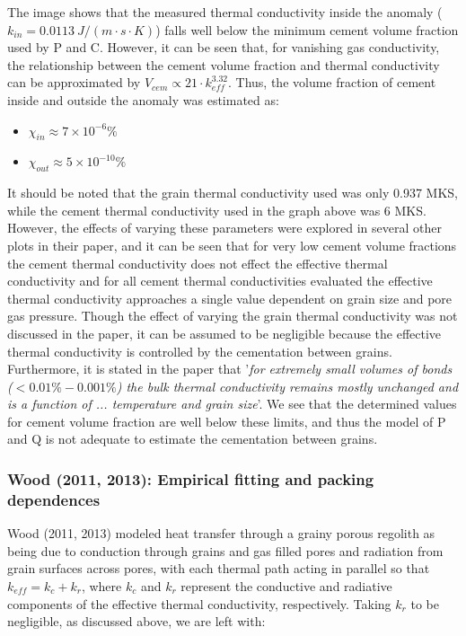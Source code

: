 \documentclass[11pt]{article} %
\begin{document}
	The image shows that the measured thermal conductivity inside the anomaly ($k_{in} = 0.0113 \: J/(m \cdot s \cdot K)$) falls well below the minimum cement volume fraction used by P and C. However, it can be seen that, for vanishing gas conductivity,  the relationship between the cement volume fraction and thermal conductivity can be approximated by $V_{cem} \varpropto 21\cdot k_{eff}^{3.32}$. Thus, the volume fraction of cement inside and outside the anomaly was estimated as:
	
	\begin{itemize}
	\item $\chi_{in} \approx 7\times10^{-6}\%$
	\item $\chi_{out} \approx 5\times10^{-10}\%$
	\end{itemize}
	
	It should be noted that the grain thermal conductivity used was only 0.937 MKS, while the cement thermal conductivity used in the graph above was 6 MKS. However, the effects of varying these parameters were explored in several other plots in their paper, and it can be seen that for very low cement volume fractions the cement thermal conductivity does not effect the effective thermal conductivity and for all cement thermal conductivities evaluated the effective thermal conductivity approaches a single value dependent on grain size and pore gas pressure. Though the effect of varying the grain thermal conductivity was not discussed in the paper, it can be assumed to be negligible because the effective thermal conductivity is controlled by the cementation between grains. Furthermore, it is stated in the paper that '\emph{for extremely small volumes of bonds ($< 0.01\%-0.001\%$) the bulk thermal conductivity remains mostly unchanged and is a function of ... temperature and grain size}'. We see that the determined values for cement volume fraction are well below these limits, and thus the model of P and Q is not adequate to estimate the cementation between grains. 

\subsubsection{Wood (2011, 2013): Empirical fitting and packing dependences}
	 Wood (2011, 2013) modeled heat transfer through a grainy porous regolith as being due to conduction through grains and gas filled pores and radiation from grain surfaces across pores, with each thermal path acting in parallel so that $k_{eff} = k_{c} + k_{r}$, where $k_{c}$ and $k_{r}$ represent the conductive and radiative components of the effective thermal conductivity, respectively. Taking $k_{r}$ to be negligible, as discussed above, we are left with:
	
\end{document}

